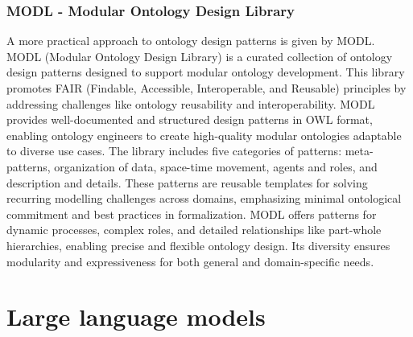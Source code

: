 \subsubsection{MODL - Modular Ontology Design Library}
A more practical approach to ontology design patterns is given by MODL. MODL (Modular Ontology Design Library) \cite{shimizu2019modl} is a curated collection of ontology design patterns designed to support modular ontology development. This library promotes FAIR (Findable, Accessible, Interoperable, and Reusable) principles by addressing challenges like ontology reusability and interoperability. MODL provides well-documented and structured design patterns in OWL format, enabling ontology engineers to create high-quality modular ontologies adaptable to diverse use cases. The library includes five categories of patterns: meta-patterns, organization of data, space-time movement, agents and roles, and description and details. These patterns are reusable templates for solving recurring modelling challenges across domains, emphasizing minimal ontological commitment and best practices in formalization. MODL offers patterns for dynamic processes, complex roles, and detailed relationships like part-whole hierarchies, enabling precise and flexible ontology design. Its diversity ensures modularity and expressiveness for both general and domain-specific needs.


\newpage
\section{Large language models}
